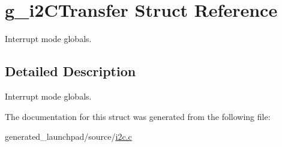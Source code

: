 \hypertarget{structg__i2CTransfer}{}\section{g\+\_\+i2\+C\+Transfer Struct Reference}
\label{structg__i2CTransfer}


Interrupt mode globals.  




\subsection{Detailed Description}
Interrupt mode globals. 

The documentation for this struct was generated from the following file\+:\begin{DoxyCompactItemize}
\item 
generated\+\_\+launchpad/source/\mbox{\hyperlink{i2c_8c}{i2c.\+c}}\end{DoxyCompactItemize}
